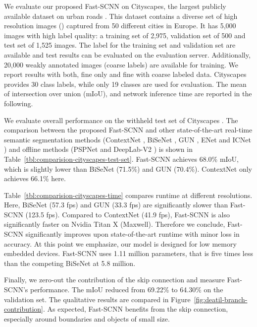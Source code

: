 \documentclass[10pt,twocolumn,letterpaper]{article}
\begin{document}
We evaluate our proposed Fast-SCNN on Cityscapes, the largest publicly available dataset on urban roads \cite{cityscaples2016}. This dataset contains a diverse set of high resolution images () captured from 50 different cities in Europe. It has 5,000 images with high label quality: a training set of 2,975, validation set of 500 and test set of 1,525 images. The label for the training set and validation set are available and test results can be evaluated on the evaluation server. Additionally, 20,000 weakly annotated images (coarse labels) are available for training. We report results with both, fine only and fine with coarse labeled data. Cityscapes provides 30 class labels, while only 19 classes are used for evaluation. The mean of intersection over union (mIoU), and network inference time are reported in the following.

We evaluate overall performance on the withheld test set of Cityscapes \cite{cityscaples2016}. The comparison between the proposed Fast-SCNN and other state-of-the-art real-time semantic segmentation methods (ContextNet \cite{contextnet-poudel2018}, BiSeNet \cite{BiSeNet-yu2018}, GUN \cite{gun-mazzini2018}, ENet \cite{enet-paszke2016} and ICNet \cite{icnet-zhao2017b}) and offline methods (PSPNet \cite{pspnet-zhao2017a} and DeepLab-V2 \cite{deeplab-v2-chen2016}) is shown in Table~\ref{tbl:comparision-cityscapes-test-set}. Fast-SCNN achieves 68.0\% mIoU, which is slightly lower than BiSeNet (71.5\%) and GUN (70.4\%). ContextNet only achieves 66.1\% here.

Table~\ref{tbl:comparision-cityscapes-time} compares runtime at different resolutions. Here, BiSeNet (57.3 fps) and GUN (33.3 fps) are significantly slower than Fast-SCNN (123.5 fps). Compared to ContextNet (41.9 fps), Fast-SCNN is also significantly faster on Nvidia Titan X (Maxwell). Therefore we conclude, Fast-SCNN significantly improves upon state-of-the-art runtime with minor loss in accuracy. At this point we emphasize, our model is designed for low memory embedded devices. Fast-SCNN uses 1.11 million parameters, that is five times less than the competing BiSeNet at 5.8 million.

Finally, we zero-out the contribution of the skip connection and measure Fast-SCNN's performance. The mIoU reduced from 69.22\% to 64.30\% on the validation set. The qualitative results are compared in Figure~\ref{fig:deatil-branch-contribution}. As expected, Fast-SCNN benefits from the skip connection, especially around boundaries and objects of small size.
\end{document}
